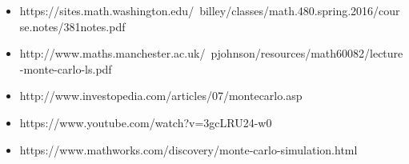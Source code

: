 \documentclass{article}
\begin{document}
\begin{itemize}
	\item https://sites.math.washington.edu/~billey/classes/math.480.spring.2016/course.notes/381notes.pdf
    \item http://www.maths.manchester.ac.uk/~pjohnson/resources/math60082/lecture-monte-carlo-ls.pdf
	\item http://www.investopedia.com/articles/07/montecarlo.asp
	\item https://www.youtube.com/watch?v=3gcLRU24-w0
	\item https://www.mathworks.com/discovery/monte-carlo-simulation.html
    
\end{itemize}

	
	
	
\end{document}
